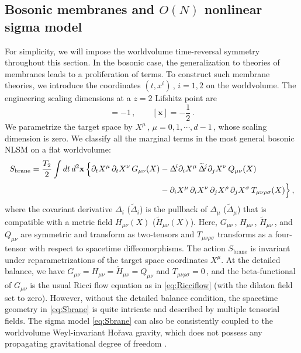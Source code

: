 \documentclass[11pt]{article}
\newcommand{\be}{\begin{equation}}
\newcommand{\ee}{\end{equation}}
\newcommand{\p}{\partial}
\renewcommand{\tilde}[1]{\widetilde{#1}}
\begin{document}
\subsection{Bosonic membranes and \texorpdfstring{$O(N)$}{ON} nonlinear sigma model}

For simplicity, we will impose the worldvolume time-reversal symmetry throughout this section.
In the bosonic case, the generalization to theories of membranes leads to a proliferation of terms. To construct such membrane theories, we introduce the coordinates $(t, x^i)$\,, $i = 1, 2$ on the worldvolume. The engineering scaling dimensions at a $z=2$ Lifshitz point are
%
\be
	[t] = -1\,,
		\qquad
	[\mathbf{x}] = - \frac{1}{2}\,.
\ee
%
We parametrize the target space by $X^\mu$\,, $\mu = 0, 1, \cdots, d-1$\,, whose scaling dimension is zero. We classify all the marginal terms in the most general bosonic NLSM on a flat worldvolume:
%
\begin{align} \label{eq:Sbrane}
\begin{split}
	S_\text{brane} = \frac{T_2}{2} \int dt \, d^2 \mathbf{x} \, \Bigl\{ \p_t X^\mu \, \p_t X^\nu \, G_{\mu\nu} (X) & - \Delta^{\!i} \p_i X^\mu \, {\tilde{\Delta}}^{\!j} \p_j X^\nu \, Q_{\mu\nu}(X) \\[2pt]
	& - \p_i X^\mu \, \p_i X^\nu \, \p_j X^\rho \, \p_j X^\sigma \, T_{\mu\nu\rho\sigma}(X) \Bigr\}\,,
\end{split}
\end{align}
%
where the covariant derivative $\Delta_i$ ($\tilde{\Delta}_i$) is the pullback of $\Delta_\mu$ ($\tilde{\Delta}_\mu$) that is compatible with a metric field $H_{\mu\nu}(X)$ ($\tilde{H}_{\mu\nu} (X)$). Here, $G_{\mu\nu}$\,, $H_{\mu\nu}$\,, $\tilde{H}_{\mu\nu}$\,, and $Q_{\mu\nu}$ are symmetric and transform as two-tensors and $T_{\mu\nu\rho\sigma}$ transforms as a four-tensor with respect to spacetime diffeomorphisms. 
The action $S_\text{brane}$ is invariant under reparametrizations of the target space coordinates $X^\mu$. At the detailed balance, we have $G_{\mu\nu} = H_{\mu\nu} = \tilde{H}_{\mu\nu} = Q_{\mu\nu}$ and $T_{\mu\nu\rho\sigma} = 0$\,, and the beta-functional of $G_{\mu\nu}$ is the usual Ricci flow equation as in \eqref{eq:Ricciflow} (with the dilaton field set to zero). However, without the detailed balance condition, the spacetime geometry in \eqref{eq:Sbrane} is quite intricate and described by multiple tensorial fields. The sigma model \eqref{eq:Sbrane} can also be consistently coupled to the worldvolume Weyl-invariant Ho\v{r}ava gravity, which does not possess any propagating gravitational degree of freedom \cite{Horava:2008ih}. 
\end{document}
